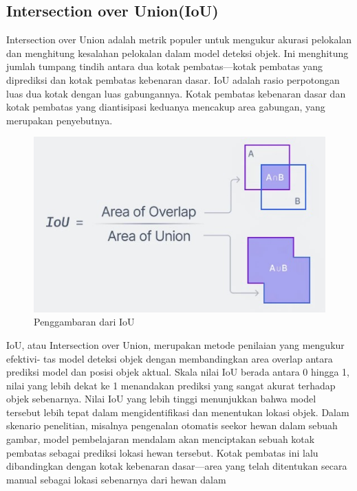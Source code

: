 \subsection{Intersection over Union(IoU)}
Intersection over Union adalah metrik populer untuk mengukur akurasi pelokalan dan menghitung kesalahan pelokalan dalam model deteksi objek. Ini menghitung jumlah tumpang tindih antara dua kotak pembatas—kotak pembatas yang diprediksi dan kotak pembatas kebenaran dasar. IoU adalah rasio perpotongan luas dua kotak dengan luas gabungannya. Kotak pembatas kebenaran dasar dan kotak pembatas yang diantisipasi keduanya mencakup area gabungan, yang merupakan penyebutnya.
\begin{figure} [H] \centering
  \includegraphics[scale=0.6]{gambar/IoU.jpg}
  \caption{Penggambaran dari IoU }
  \label{fig:Intersection over Union }
\end{figure}
IoU, atau Intersection over Union, merupakan metode penilaian yang mengukur efektivi-
tas model deteksi objek dengan membandingkan area overlap antara prediksi model dan posisi
objek aktual. Skala nilai IoU berada antara 0 hingga 1, nilai yang lebih dekat ke 1 menandakan prediksi yang sangat akurat terhadap objek sebenarnya. Nilai IoU yang lebih tinggi menunjukkan bahwa model tersebut lebih tepat dalam mengidentifikasi dan menentukan lokasi objek. Dalam skenario penelitian, misalnya pengenalan otomatis seekor hewan dalam sebuah gambar, model pembelajaran mendalam akan menciptakan sebuah kotak pembatas sebagai
prediksi lokasi hewan tersebut. Kotak pembatas ini lalu dibandingkan dengan kotak kebenaran
dasar—area yang telah ditentukan secara manual sebagai lokasi sebenarnya dari hewan dalam
